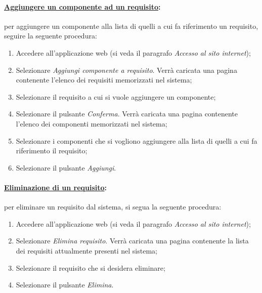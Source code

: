 \paragraph{\underline{Aggiungere un componente ad un requisito}:}
per aggiungere un componente alla lista di quelli a cui fa riferimento un requisito, seguire la seguente procedura:
\begin{enumerate}
\item Accedere all'applicazione web (si veda il paragrafo \textit{Accesso al sito internet});
\item Selezionare \textit{Aggiungi componente a requisito}. Verrà caricata una pagina contenente l'elenco dei requisiti memorizzati nel sistema;
\item Selezionare il requisito a cui si vuole aggiungere un componente;
\item Selezionare il pulsante \textit{Conferma}. Verrà caricata una pagina contenente l'elenco dei componenti memorizzati nel sistema;
\item Selezionare i componenti che si vogliono aggiungere alla lista di quelli a cui fa riferimento il requisito;
\item Selezionare il pulsante \textit{Aggiungi}.
\end{enumerate}

\paragraph{\underline{Eliminazione di un requisito}:}
per eliminare un requisito dal sistema, si segua la seguente procedura:
\begin{enumerate}
\item Accedere all'applicazione web (si veda il paragrafo \textit{Accesso al sito internet});
\item Selezionare \textit{Elimina requisito}. Verrà caricata una pagina contenente la lista dei requisiti attualmente presenti nel sistema;
\item Selezionare il requisito che si desidera eliminare;
\item Selezionare il pulsante \textit{Elimina}.
\end{enumerate}

